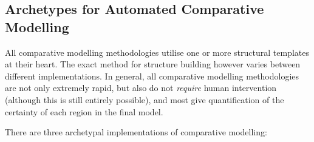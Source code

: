 \subsection{Archetypes for Automated Comparative Modelling}
\label{section:protmodel:comparativemodellingarchetypes}


All comparative modelling methodologies utilise one or more structural templates at their
heart. The exact method   for structure building however varies between different
implementations. In general, all comparative modelling methodologies are not only extremely rapid, but also do not
\emph{require} human intervention (although this is still entirely possible),
and most give quantification of the certainty
of each region in the final model. 

There are three archetypal implementations
of comparative modelling:
